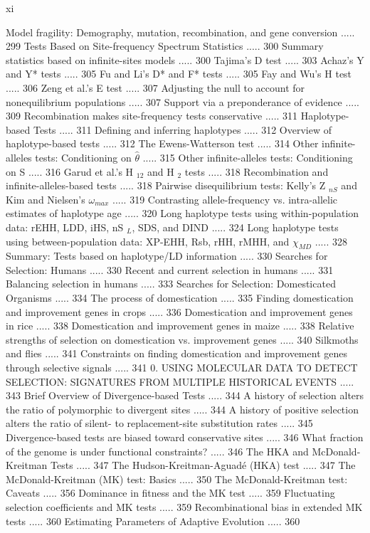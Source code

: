 \documentclass{article}
\begin{document}
xi

Model fragility: Demography, mutation, recombination, and gene conversion ..... 299
Tests Based on Site-frequency Spectrum Statistics ..... 300
Summary statistics based on infinite-sites models ..... 300
Tajima's D test ..... 303
Achaz's Y and Y* tests ..... 305
Fu and Li's D* and F* tests ..... 305
Fay and Wu's H test ..... 306
Zeng et al.'s E test ..... 307
Adjusting the null to account for nonequilibrium populations ..... 307
Support via a preponderance of evidence ..... 309
Recombination makes site-frequency tests conservative ..... 311
Haplotype-based Tests ..... 311
Defining and inferring haplotypes ..... 312
Overview of haplotype-based tests ..... 312
The Ewens-Watterson test ..... 314
Other infinite-alleles tests: Conditioning on  $ \widehat{\theta} $ ..... 315
Other infinite-alleles tests: Conditioning on S ..... 316
Garud et al.'s H $ _{12} $ and H $ _{2} $ tests ..... 318
Recombination and infinite-alleles-based tests ..... 318
Pairwise disequilibrium tests: Kelly's Z $ _{nS} $ and Kim and Nielsen's  $ \omega_{max} $ ..... 319
Contrasting allele-frequency vs. intra-allelic estimates of haplotype age ..... 320
Long haplotype tests using within-population data:
rEHH, LDD, iHS, nS $ _{L} $, SDS, and DIND ..... 324
Long haplotype tests using between-population data:
XP-EHH, Rsb, rHH, rMHH, and  $ \chi_{MD} $ ..... 328
Summary: Tests based on haplotype/LD information ..... 330
Searches for Selection: Humans ..... 330
Recent and current selection in humans ..... 331
Balancing selection in humans ..... 333
Searches for Selection: Domesticated Organisms ..... 334
The process of domestication ..... 335
Finding domestication and improvement genes in crops ..... 336
Domestication and improvement genes in rice ..... 338
Domestication and improvement genes in maize ..... 338
Relative strengths of selection on domestication vs. improvement genes ..... 340
Silkmoths and flies ..... 341
Constraints on finding domestication and improvement genes through selective signals ..... 341
0. USING MOLECULAR DATA TO DETECT SELECTION:
SIGNATURES FROM MULTIPLE HISTORICAL EVENTS ..... 343
Brief Overview of Divergence-based Tests ..... 344
A history of selection alters the ratio of polymorphic to divergent sites ..... 344
A history of positive selection alters the ratio of silent- to replacement-site substitution rates ..... 345
Divergence-based tests are biased toward conservative sites ..... 346
What fraction of the genome is under functional constraints? ..... 346
The HKA and McDonald-Kreitman Tests ..... 347
The Hudson-Kreitman-Aguadé (HKA) test ..... 347
The McDonald-Kreitman (MK) test: Basics ..... 350
The McDonald-Kreitman test: Caveats ..... 356
Dominance in fitness and the MK test ..... 359
Fluctuating selection coefficients and MK tests ..... 359
Recombinational bias in extended MK tests ..... 360
Estimating Parameters of Adaptive Evolution ..... 360
\end{document}
